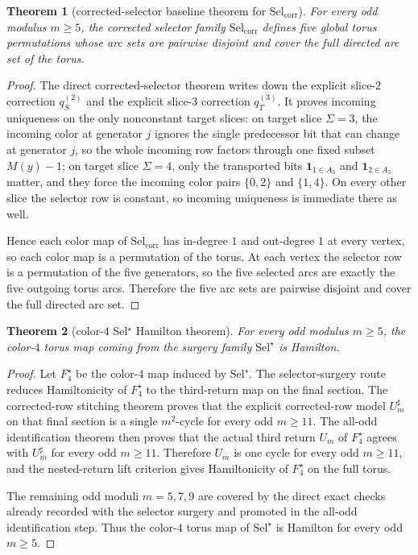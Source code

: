 \documentclass[11pt]{article}
\newtheorem{theorem}{Theorem}[section]
\newcommand{\SelCorr}{\mathrm{Sel}_{\mathrm{corr}}}
\newcommand{\SelStar}{\mathrm{Sel}^{\star}}
\begin{document}
\begin{theorem}[corrected-selector baseline theorem for $\SelCorr$]
\label{thm:M4-SelCorr}
For every odd modulus $m\ge 5$, the corrected selector family $\SelCorr$
defines five global torus permutations whose arc sets are pairwise disjoint and
cover the full directed arc set of the torus.
\end{theorem}

\begin{proof}
The direct corrected-selector theorem writes down the explicit slice-\(2\)
correction \(q^{(2)}_S\) and the explicit slice-\(3\) correction \(q^{(3)}_T\).
It proves incoming uniqueness on the only nonconstant target slices:
on target slice \(\Sigma=3\), the incoming color at generator \(j\) ignores the
single predecessor bit that can change at generator \(j\), so the whole
incoming row factors through one fixed subset \(M(y)-1\);
on target slice \(\Sigma=4\), only the transported bits
\(\mathbf 1_{1\in A_3}\) and \(\mathbf 1_{2\in A_3}\) matter, and they force the
incoming color pairs \(\{0,2\}\) and \(\{1,4\}\).
On every other slice the selector row is constant, so incoming uniqueness is
immediate there as well.

Hence each color map of \(\SelCorr\) has in-degree \(1\) and out-degree \(1\) at
every vertex, so each color map is a permutation of the torus.
At each vertex the selector row is a permutation of the five generators, so the
five selected arcs are exactly the five outgoing torus arcs.
Therefore the five arc sets are pairwise disjoint and cover the full directed
arc set.
\end{proof}

\begin{theorem}[color-$4$ Sel$^{\star}$ Hamilton theorem]
\label{thm:M5-color4}
For every odd modulus $m\ge 5$, the color-$4$ torus map coming from the surgery
family $\SelStar$ is Hamilton.
\end{theorem}

\begin{proof}
Let \(F_4^\star\) be the color-$4$ map induced by \(\SelStar\).
The selector-surgery route reduces Hamiltonicity of \(F_4^\star\) to the
third-return map on the final section.
The corrected-row stitching theorem proves that the explicit corrected-row model
\(U_m^\sharp\) on that final section is a single \(m^2\)-cycle for every odd
\(m\ge 11\).
The all-odd identification theorem then proves that the actual third return
\(U_m\) of \(F_4^\star\) agrees with \(U_m^\sharp\) for every odd \(m\ge 11\).
Therefore \(U_m\) is one cycle for every odd \(m\ge 11\), and the nested-return
lift criterion gives Hamiltonicity of \(F_4^\star\) on the full torus.

The remaining odd moduli \(m=5,7,9\) are covered by the direct exact checks
already recorded with the selector surgery and promoted in the all-odd
identification step.
Thus the color-$4$ torus map of \(\SelStar\) is Hamilton for every odd
\(m\ge 5\).
\end{proof}
\end{document}
